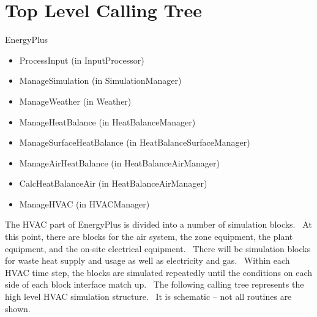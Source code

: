 \section{Top Level Calling Tree}\label{top-level-calling-tree}

EnergyPlus

\begin{itemize}
\item
  ProcessInput (in InputProcessor)
\item
  ManageSimulation (in SimulationManager)
\item
  ManageWeather (in Weather)
\item
  ManageHeatBalance (in HeatBalanceManager)
\item
  ManageSurfaceHeatBalance (in HeatBalanceSurfaceManager)
\item
  ManageAirHeatBalance (in HeatBalanceAirManager)
\item
  CalcHeatBalanceAir (in HeatBalanceAirManager)
\item
  ManageHVAC (in HVACManager)
\end{itemize}

The HVAC part of EnergyPlus is divided into a number of simulation blocks.~ At this point, there are blocks for the air system, the zone equipment, the plant equipment, and the on-site electrical equipment.~ There will be simulation blocks for waste heat supply and usage as well as electricity and gas.~ Within each HVAC time step, the blocks are simulated repeatedly until the conditions on each side of each block interface match up.~ The following calling tree represents the high level HVAC simulation structure.~ It is schematic -- not all routines are shown.

